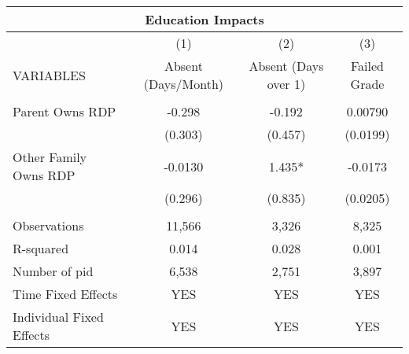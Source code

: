 \begin{tabular}{lccc}
\multicolumn{4}{c}{Education Impacts} \\ \hline
 & (1) & (2) & (3) \\
VARIABLES & Absent (Days/Month) & Absent (Days over 1) & Failed Grade \\ \hline
 &  &  &  \\
Parent Owns RDP & -0.298 & -0.192 & 0.00790 \\
 & (0.303) & (0.457) & (0.0199) \\
Other Family Owns RDP & -0.0130 & 1.435* & -0.0173 \\
 & (0.296) & (0.835) & (0.0205) \\
 &  &  &  \\
Observations & 11,566 & 3,326 & 8,325 \\
R-squared & 0.014 & 0.028 & 0.001 \\
Number of pid & 6,538 & 2,751 & 3,897 \\
Time Fixed Effects & YES & YES & YES \\
 Individual Fixed Effects & YES & YES & YES \\ \hline
\end{tabular}
